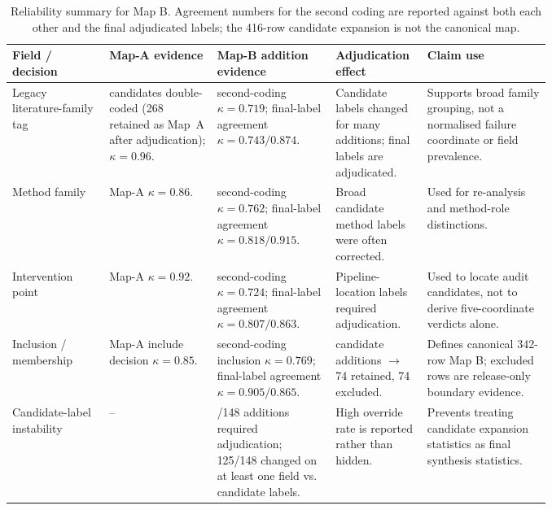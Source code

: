 \begin{table}[t]
\centering
\scriptsize
\renewcommand{\arraystretch}{0.9}
\begin{tabularx}{\linewidth}{>{\raggedright\arraybackslash}p{0.18\linewidth}>{\raggedright\arraybackslash}p{0.20\linewidth}>{\raggedright\arraybackslash}p{0.22\linewidth}>{\raggedright\arraybackslash}p{0.17\linewidth}X}
\toprule
\textbf{Field / decision} & \textbf{Map-A evidence} & \textbf{Map-B addition evidence} & \textbf{Adjudication effect} & \textbf{Claim use} \\
\midrule
Legacy literature-family tag & 274 candidates double-coded (268 retained as Map~A after adjudication); $\kappa=0.96$. & second-coding $\kappa=0.719$; final-label agreement $\kappa=0.743/0.874$. & Candidate labels changed for many additions; final labels are adjudicated. & Supports broad family grouping, not a normalised failure coordinate or field prevalence. \\
Method family & Map-A $\kappa=0.86$. & second-coding $\kappa=0.762$; final-label agreement $\kappa=0.818/0.915$. & Broad candidate method labels were often corrected. & Used for re-analysis and method-role distinctions. \\
Intervention point & Map-A $\kappa=0.92$. & second-coding $\kappa=0.724$; final-label agreement $\kappa=0.807/0.863$. & Pipeline-location labels required adjudication. & Used to locate audit candidates, not to derive five-coordinate verdicts alone. \\
Inclusion / membership & Map-A include decision $\kappa=0.85$. & second-coding inclusion $\kappa=0.769$; final-label agreement $\kappa=0.905/0.865$. & 148 candidate additions $\rightarrow$ 74 retained, 74 excluded. & Defines canonical 342-row Map B; excluded rows are release-only boundary evidence. \\
Candidate-label instability & -- & 139/148 additions required adjudication; 125/148 changed on at least one field vs. candidate labels. & High override rate is reported rather than hidden. & Prevents treating candidate expansion statistics as final synthesis statistics. \\
\bottomrule
\end{tabularx}
\caption{Reliability summary for Map B. Agreement numbers for the second coding are reported against both each other and the final adjudicated labels; the 416-row candidate expansion is not the canonical map.}
\label{tab:main-map-b-reliability}
\end{table}

